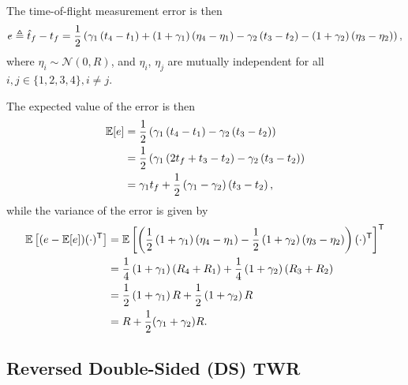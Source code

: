 \documentclass{decar-wsd}    %
\begin{document}
The time-of-flight measurement error is then
\begin{equation}
    e \triangleq \hat{t}_f - t_f = \frac{1}{2} \left( \gamma_1 \left( t_4 - t_1 \right) + \left( 1 + \gamma_1\right) \left( \eta_4 - \eta_1 \right) - \gamma_2 \left( t_3 - t_2 \right) - \left( 1 + \gamma_2\right) \left( \eta_3 - \eta_2 \right) \right),
\end{equation}
where $\eta_i \sim \mathcal{N} \left(0, R\right)$, and $\eta_i$, $\eta_j$ are mutually independent for all $i,j \in \{1,2,3,4\}, i \neq j$.

The expected value of the error is then
\begin{align}
    \mathbb{E} [e] &= \frac{1}{2} \left( \gamma_1 \left( t_4 - t_1 \right) - \gamma_2 \left( t_3 - t_2 \right) \right) \\
    &= \frac{1}{2} \left( \gamma_1 \left( 2t_f + t_3 - t_2 \right) - \gamma_2 \left( t_3 - t_2 \right) \right) \\
    &= \gamma_1 t_f + \frac{1}{2} \left(\gamma_1 - \gamma_2\right) \left( t_3 - t_2 \right),
\end{align}
while the variance of the error is given by
\begin{align}
    \mathbb{E} \left[ (e - \mathbb{E}[e])(\cdot)^{\mathsf{T}} \right] &= \mathbb{E} \left[ \left(\frac{1}{2} \left( 1 + \gamma_1\right) \left( \eta_4 - \eta_1 \right) - \frac{1}{2}\left( 1 + \gamma_2\right) \left( \eta_3 - \eta_2 \right) \right) (\cdot)^{\mathsf{T}} \right]^{\mathsf{T}} \\
    &= \frac{1}{4}\left( 1+\gamma_1 \right)\left( R_4 + R_1 \right) + \frac{1}{4} \left(1 + \gamma_2 \right) \left( R_3 + R_2 \right) \\
    &= \frac{1}{2}\left( 1+\gamma_1 \right) R + \frac{1}{2} \left(1 + \gamma_2 \right) R \\
    &= R + \frac{1}{2}(\gamma_1 + \gamma_2) R.
\end{align}

\subsection{Reversed Double-Sided (DS) TWR}
\end{document}

